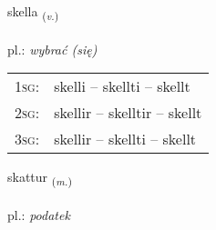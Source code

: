 \documentclass[frontgrid, backgrid]{flacards}\usepackage[]{graphicx}\usepackage[]{xcolor}
\begin{document}
\renewcommand{\flhead}{\vskip5pt \fboxsep=0pt {\small\bfseries\footnotesize Sagnorð | Verb}}
\renewcommand{\fcfoot}{\vskip5pt \fboxsep=0pt \hspace{2pt}{\small\bfseries\footnotesize 2K}}

\renewcommand{\blhead}{\vskip5pt {\small\bfseries\footnotesize Sagnorð | Verb }}
\renewcommand{\bcfoot}{\vskip5pt \hspace{2pt}{\small\bfseries\footnotesize 2K}}


{skella \small{\textsubscript{(\textit{v.})}} \\[1ex] %
\textphonetic{[scɛtla]} \\
pl.: \emph{wybrać (się)} \\  [2ex]
\renewcommand*{\arraystretch}{0.8}
\begin{tabular}{p{1cm}l}
\textsc{1sg}: & skelli -- skellti -- skellt \\ 
\textsc{2sg}: & skellir -- skelltir -- skellt \\ 
\textsc{3sg}: & skellir -- skellti -- skellt \\ 
\end{tabular}
}

\renewcommand{\flhead}{\vskip5pt \fboxsep=0pt {\small\bfseries\footnotesize Nafnorð | Noun}}
\renewcommand{\fcfoot}{\vskip5pt \fboxsep=0pt \hspace{2pt}{\small\bfseries\footnotesize 2K}}

\renewcommand{\blhead}{\vskip5pt {\small\bfseries\footnotesize Nafnorð | Noun }}
\renewcommand{\bcfoot}{\vskip5pt \hspace{2pt}{\small\bfseries\footnotesize 2K}}


{skattur \small{\textsubscript{(\textit{m.})}} \\[1ex] %
\textphonetic{[skahtʏr]} \\
pl.: \emph{podatek} \\  [2ex]
\renewcommand*{\arraystretch}{0.8}
}
\end{document}
